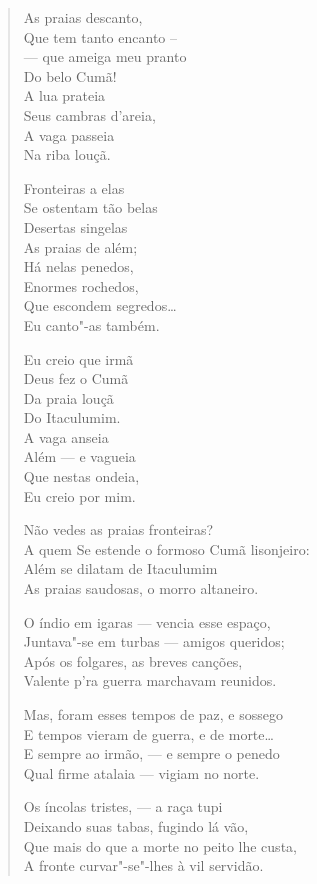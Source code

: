 \begin{verse}
As praias descanto,\\
Que tem tanto encanto --\\
--- que ameiga meu pranto\\
Do belo Cumã!\\
A lua prateia\\
Seus cambras d'areia,\\
A vaga passeia\\
Na riba louçã.

Fronteiras a elas\\
Se ostentam tão belas\\
Desertas singelas\\
As praias de além;\\
Há nelas penedos,\\
Enormes rochedos,\\
Que escondem segredos\ldots{}\\
Eu canto"-as também.

Eu creio que irmã\\
Deus fez o Cumã\\
Da praia louçã\\
Do Itaculumim.\\
A vaga anseia\\
Além --- e vagueia\\
Que nestas ondeia,\\
Eu creio por mim.

Não vedes as praias fronteiras?\\
A quem Se estende o formoso Cumã lisonjeiro:\\
Além se dilatam de Itaculumim\\
As praias saudosas, o morro altaneiro.

O índio em igaras --- vencia esse espaço,\\
Juntava"-se em turbas --- amigos queridos;\\
Após os folgares, as breves canções,\\
Valente p'ra guerra marchavam reunidos.

Mas, foram esses tempos de paz, e sossego\\
E tempos vieram de guerra, e de morte\ldots{}\\
E sempre ao irmão, --- e sempre o penedo\\
Qual firme atalaia --- vigiam no norte.

Os íncolas tristes, --- a raça tupi\\
Deixando suas tabas, fugindo lá vão,\\
Que mais do que a morte no peito lhe custa,\\
A fronte curvar"-se"-lhes à vil servidão.


\end{verse}
